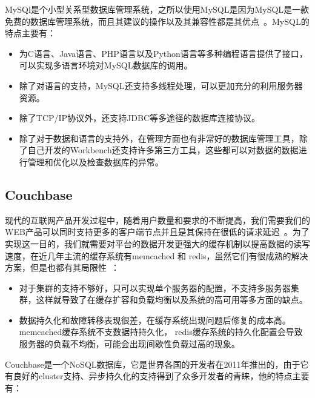MySQl是个小型关系型数据库管理系统，之所以使用MySQL是因为MySQL是一款免费的数据库管理系统，而且其建议的操作以及其兼容性都是其优点~\cite{greenspan2001mysql}。MySQL的特点主要有\cite{王川2009农业机械装备信息管理系统的设计和研究}：

\begin{itemize}

\item 为C语言、Java语言、PHP语言以及Python语言等多种编程语言提供了接口，可以实现多语言环境对MySQL数据库的调用。

\item 除了对语言的支持，MySQL还支持多线程处理，可以更加充分的利用服务器资源。

\item 除了TCP/IP协议外，还支持JDBC等多途径的数据库连接协议。

\item 除了对于数据和语言的支持外，在管理方面也有非常好的数据库管理工具，除了自己开发的Workbench还支持许多第三方工具，这些都可以对数据的数据进行管理和优化以及检查数据库的异常。

\end{itemize}

\subsection{Couchbase}

现代的互联网产品开发过程中，随着用户数量和要求的不断提高，我们需要我们的WEB产品可以同时支持更多的客户端节点并且是其保持在很低的请求延迟~\cite{brown2012getting}。为了实现这一目的，我们就需要对平台的数据开发更强大的缓存机制以提高数据的读写速度，在近几年主流的缓存系统有memcached 和 redis，虽然它们有很成熟的解决方案，但是也都有其局限性~\cite{kovacs2013cassandra}：

\begin{itemize}

\item 对于集群的支持不够好，只可以实现单个服务器的配置，不支持多服务器集群，这样就导致了在缓存扩容和负载均衡以及系统的高可用等多方面的缺点。

\item 数据持久化和故障转移表现很差，在缓存系统出现问题后修复的成本高。memcached缓存系统不支数据持持久化， redis缓存系统的持久化配置会导致服务器的负载不均衡，可能会出现间歇性负载过高的现象。

\end{itemize}

Couchbase是一个NoSQL数据库，它是世界各国的开发者在2011年推出的，由于它有良好的cluster支持、异步持久化的支持得到了众多开发者的青睐，他的特点主要有：

